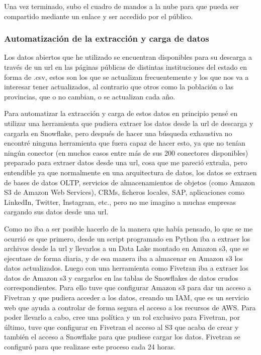 Una vez terminado, subo el cuadro de mandos a la nube para que pueda ser compartido mediante un enlace y ser accedido por el público.


\subsubsection{Automatización de la extracción y carga de datos}

Los datos abiertos que he utilizado se encuentran disponibles para su descarga a través de un url en las páginas públicas de distintas instituciones del estado en forma de .csv, estos son los que se actualizan frecuentemente y los que nos va a interesar tener actualizados, al contrario que otros como la población o las provincias, que o no cambian, o se actualizan cada año.

Para automatizar la extracción y carga de estos datos en principio  pensé en utilizar una herramienta que pudiera extraer los datos desde la url de descarga y cargarla en Snowflake, pero después de hacer una búsqueda exhaustiva no encontré ninguna herramienta que fuera capaz de hacer esto, ya que no tenían ningún conector (en muchos casos entre más de sus 200 conectores disponibles) preparado para extraer datos desde una url, cosa que me pareció extraña, pero entendible ya que normalmente en una arquitectura de datos, los datos se extraen de bases de datos OLTP, servicios de almacenamientos de objetos (como Amazon S3 de Amazon Web Services), CRMs, ficheros locales, SAP, aplicaciones como LinkedIn, Twitter, Instagram, etc., pero no me imagino a muchas empresas cargando sus datos desde una url.

Como no iba a ser posible hacerlo de la manera que había pensado, lo que se me ocurrió es que primero, desde un script programado en Python iba a extraer los archivos desde la url y llevarlos a un Data Lake montado en Amazon s3, que se ejecutase de forma diaria, y de esa manera iba a almacenar en Amazon s3 los datos actualizados. Luego con una herramienta como Fivetran iba a extraer los datos de Amazon s3 y cargarlos en las tablas de Snowflakes de datos crudos correspondientes. Para ello tuve que configurar Amazon s3 para dar un acceso a Fivetran y que pudiera acceder a los datos, creando un IAM, que es un servicio web que ayuda a controlar de forma segura el acceso a los recursos de AWS. Para poder llevarlo a cabo, cree una política y un rol exclusivo para Fivetran, por último, tuve que configurar en Fivetran el acceso al S3 que acaba de crear y también el acceso a Snowflake para que pudiese cargar los datos. Fivetran se configuró para que realizase este proceso cada 24 horas.

